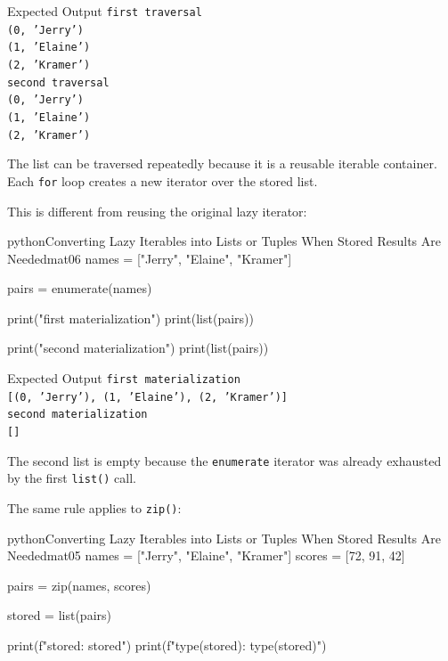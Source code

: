\documentclass[a4paper,twoside]{report}
\begin{document}
\begin{iobox}{Expected Output}
\texttt{first traversal} \\
\texttt{(0, 'Jerry')} \\
\texttt{(1, 'Elaine')} \\
\texttt{(2, 'Kramer')} \\
\texttt{second traversal} \\
\texttt{(0, 'Jerry')} \\
\texttt{(1, 'Elaine')} \\
\texttt{(2, 'Kramer')} \\
\end{iobox}


The list can be traversed repeatedly because it is a reusable iterable container. Each \texttt{for} loop creates a new iterator over the stored list.

This is different from reusing the original lazy iterator:

\begin{codebox}[]{python}{Converting Lazy Iterables into Lists or Tuples When Stored Results Are Needed}{mat06}
names = ["Jerry", "Elaine", "Kramer"]

pairs = enumerate(names)

print("first materialization")
print(list(pairs))

print("second materialization")
print(list(pairs))
\end{codebox}


\begin{iobox}{Expected Output}
\texttt{first materialization} \\
\texttt{[(0, 'Jerry'), (1, 'Elaine'), (2, 'Kramer')]} \\
\texttt{second materialization} \\
\texttt{[]} \\
\end{iobox}


The second list is empty because the \texttt{enumerate} iterator was already exhausted by the first \texttt{list()} call.

The same rule applies to \texttt{zip()}:

\begin{codebox}[]{python}{Converting Lazy Iterables into Lists or Tuples When Stored Results Are Needed}{mat05}
names = ["Jerry", "Elaine", "Kramer"]
scores = [72, 91, 42]

pairs = zip(names, scores)

stored = list(pairs)

print(f"stored: {stored}")
print(f"type(stored): {type(stored)}")
\end{codebox}
\end{document}
